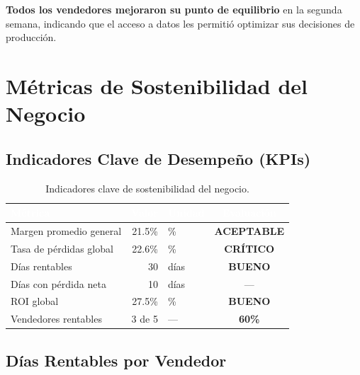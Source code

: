\documentclass[12pt,letterpaper]{article}
\begin{document}
\textbf{Todos los vendedores mejoraron su punto de equilibrio} en la segunda semana, indicando que el acceso a datos les permitió optimizar sus decisiones de producción.

\newpage
\section{Métricas de Sostenibilidad del Negocio}

\subsection{Indicadores Clave de Desempeño (KPIs)}

\begin{table}[H]
\centering
{}
\begin{tabular}{l r l c}
\toprule
\rowcolor{tabheader}
\textcolor{white}{\textbf{Métrica}} &
\textcolor{white}{\textbf{Valor}} &
\textcolor{white}{\textbf{Unidad}} &
\textcolor{white}{\textbf{Evaluación}} \\
\midrule
Margen promedio general    & 21.5\%  & \%    & \textcolor{warning}{\textbf{ACEPTABLE}} \\
Tasa de pérdidas global    & 22.6\%  & \%    & \textcolor{danger}{\textbf{CRÍTICO}} \\
Días rentables             & 30      & días  & \textcolor{success}{\textbf{BUENO}} \\
Días con pérdida neta      & 10      & días  & --- \\
ROI global                 & 27.5\%  & \%    & \textcolor{success}{\textbf{BUENO}} \\
Vendedores rentables       & 3 de 5  & ---   & \textcolor{warning}{\textbf{60\%}} \\
\bottomrule
\end{tabular}
\caption{Indicadores clave de sostenibilidad del negocio.}
\end{table}

\subsection{Días Rentables por Vendedor}
\end{document}
